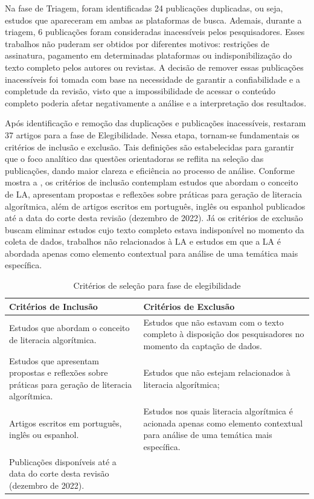 Na fase de Triagem, foram identificadas 24 publicações duplicadas, ou
seja, estudos que apareceram em ambas as plataformas de busca. Ademais,
durante a triagem, 6 publicações foram consideradas inacessíveis pelos
pesquisadores. Esses trabalhos não puderam ser obtidos por diferentes
motivos: restrições de assinatura, pagamento em determinadas plataformas
ou indisponibilização do texto completo pelos autores ou revistas. A
decisão de remover essas publicações inacessíveis foi tomada com base na
necessidade de garantir a confiabilidade e a completude da revisão,
visto que a impossibilidade de acessar o conteúdo completo poderia
afetar negativamente a análise e a interpretação dos resultados.

Após identificação e remoção das duplicações e publicações inacessíveis,
restaram 37 artigos para a fase de Elegibilidade. Nessa etapa, tornam-se
fundamentais os critérios de inclusão e exclusão. Tais definições são
estabelecidas para garantir que o foco analítico das questões
orientadoras se reflita na seleção das publicações, dando maior clareza
e eficiência ao processo de análise. Conforme mostra a , os
critérios de inclusão contemplam estudos que abordam o conceito de LA,
apresentam propostas e reflexões sobre práticas para geração de
literacia algorítmica, além de artigos escritos em português, inglês ou
espanhol publicados até a data do corte desta revisão (dezembro de
2022). Já os critérios de exclusão buscam eliminar estudos cujo texto
completo estava indisponível no momento da coleta de dados, trabalhos
não relacionados à LA e estudos em que a LA é abordada apenas como
elemento contextual para análise de uma temática mais específica.

   
\begin{table}[!htpb]
\centering
\begin{threeparttable}
\caption{Critérios de seleção para fase de elegibilidade}
\label{tab-02}
\begin{tabular}{p{} p{}}
\toprule
Critérios de Inclusão & Critérios de Exclusão \\
\midrule
Estudos que abordam o conceito de literacia algorítmica. & Estudos que não estavam com o texto completo à disposição dos pesquisadores no momento da captação de dados.\\
Estudos que apresentam propostas e reflexões sobre práticas para geração de literacia algorítmica. & Estudos que não estejam relacionados à literacia algorítmica;\\
Artigos escritos em português, inglês ou espanhol. & Estudos nos quais literacia algorítmica é acionada apenas como elemento contextual para análise de uma temática mais específica. \\
Publicações disponíveis até a data do corte desta revisão (dezembro de 2022). & \\
\bottomrule
\end{tabular}
\end{threeparttable}
\end{table}   


